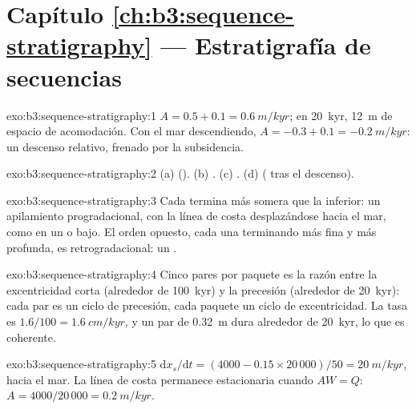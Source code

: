 \section*{Capítulo \ref{ch:b3:sequence-stratigraphy} --- Estratigrafía de secuencias}

\begin{solution}{exo:b3:sequence-stratigraphy:1}
$A = 0.5 + 0.1 = \qty{0.6}{m/kyr}$; en \qty{20}{kyr}, \qty{12}{m} de
espacio de acomodación. Con el mar descendiendo, $A = -0.3 + 0.1 = \qty{-0.2}{m/kyr}$: un
descenso relativo, frenado por la subsidencia.
\end{solution}

\begin{solution}{exo:b3:sequence-stratigraphy:2}
(a)  (). (b) . (c)
. (d)  ( tras el descenso).
\end{solution}

\begin{solution}{exo:b3:sequence-stratigraphy:3}
Cada  termina más somera que la inferior: un apilamiento progradacional,
con la línea de costa desplazándose hacia el mar, como en un  o bajo. El
orden opuesto, cada una terminando más fina y más profunda, es retrogradacional: un
.
\end{solution}

\begin{solution}{exo:b3:sequence-stratigraphy:4}
Cinco pares por paquete es la razón entre la excentricidad corta (alrededor de
\qty{100}{kyr}) y la precesión (alrededor de \qty{20}{kyr}): cada par es un
ciclo de precesión, cada paquete un ciclo de excentricidad. La tasa es
$1.6/100 = \qty{1.6}{cm/kyr}$, y un par de \qty{0.32}{m} dura alrededor de
\qty{20}{kyr}, lo que es coherente.
\end{solution}

\begin{solution}{exo:b3:sequence-stratigraphy:5}
$\mathrm dx_s/\mathrm dt = (4000 - 0.15\times20\,000)/50 = \qty{20}{m/kyr}$,
hacia el mar. La línea de costa permanece estacionaria cuando $AW = Q$: $A = 4000/20\,000 =
\qty{0.2}{m/kyr}$.
\end{solution}

